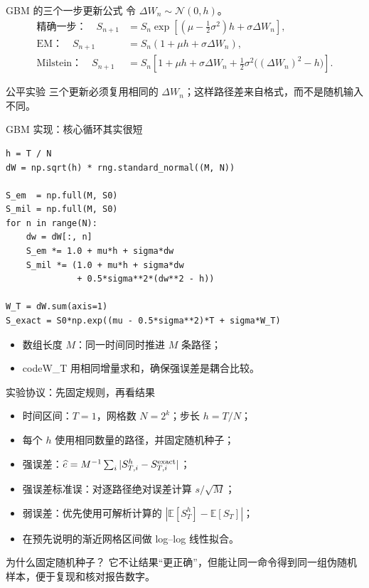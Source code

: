 \documentclass[aspectratio=169,10pt,fontset=none]{ctexbeamer}
\newcommand{\E}{\mathbb{E}}
\newcommand{\Normal}{\mathcal{N}}
\begin{document}
\begin{frame}{GBM 的三个一步更新公式}
  令 $\Delta W_n\sim\Normal(0,h)$。
  \begin{align*}
    \text{精确一步：}\quad
    S_{n+1}&=S_n\exp\!\left[
      \left(\mu-\tfrac12\sigma^2\right)h+\sigma\Delta W_n\right],\\[0.4em]
    \text{EM：}\quad
    S_{n+1}&=S_n\left(1+\mu h+\sigma\Delta W_n\right),\\[0.4em]
    \text{Milstein：}\quad
    S_{n+1}&=S_n\left[1+\mu h+\sigma\Delta W_n
      +\tfrac12\sigma^2\bigl((\Delta W_n)^2-h\bigr)\right].
  \end{align*}
  \begin{block}{公平实验}
    三个更新必须复用相同的 $\Delta W_n$；这样路径差来自格式，而不是随机输入不同。
  \end{block}
\end{frame}

\begin{frame}[fragile]{GBM 实现：核心循环其实很短}
\begin{lstlisting}
h = T / N
dW = np.sqrt(h) * rng.standard_normal((M, N))

S_em  = np.full(M, S0)
S_mil = np.full(M, S0)
for n in range(N):
    dw = dW[:, n]
    S_em *= 1.0 + mu*h + sigma*dw
    S_mil *= (1.0 + mu*h + sigma*dw
              + 0.5*sigma**2*(dw**2 - h))

W_T = dW.sum(axis=1)
S_exact = S0*np.exp((mu - 0.5*sigma**2)*T + sigma*W_T)
\end{lstlisting}
  \vspace{-0.4em}
  \begin{itemize}
    \item 数组长度 $M$：同一时间同时推进 $M$ 条路径；
    \item code{W\_T} 用相同增量求和，确保强误差是耦合比较。
  \end{itemize}
\end{frame}

\begin{frame}{实验协议：先固定规则，再看结果}
  \begin{itemize}
    \item 时间区间：$T=1$，网格数 $N=2^k$；步长 $h=T/N$；
    \item 每个 $h$ 使用相同数量的路径，并固定随机种子；
    \item 强误差：$\widehat e= M^{-1}\sum_i |S_{T,i}^{h}-S_{T,i}^{\rm exact}|$；
    \item 强误差标准误：对逐路径绝对误差计算 $s/\sqrt M$；
    \item 弱误差：优先使用可解析计算的 $|\E[S_T^h]-\E[S_T]|$；
    \item 在预先说明的渐近网格区间做 log--log 线性拟合。
  \end{itemize}
  \begin{alertblock}{为什么固定随机种子？}
    它不让结果“更正确”，但能让同一命令得到同一组伪随机样本，便于复现和核对报告数字。
  \end{alertblock}
\end{frame}
\end{document}
